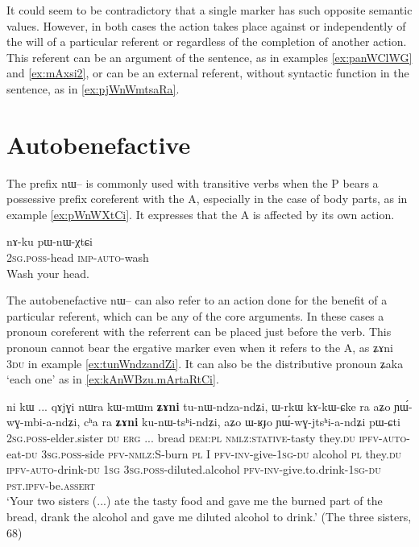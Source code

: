 \documentclass[oldfontcommands,oneside,a4paper,11pt]{article}
\newcommand{\ipa}[1]{{\phon \mbox{#1}}} %
\begin{document}
It could seem to be contradictory that a single marker has such opposite semantic values. However, in both cases the action takes place against or independently of the will of a particular referent or regardless of the completion of another action. This referent can be an argument of the sentence, as in examples \ref{ex:panWClWG} and \ref{ex:mAxsi2}, or can be an external referent, without syntactic function in the sentence, as in \ref{ex:pjWnWmtsaRa}. 


 
\section{Autobenefactive}

The prefix \ipa{nɯ--}  is commonly used with transitive verbs when the P bears a possessive prefix coreferent with the A, especially in the case of body parts, as in example \ref{ex:pWnWXtCi}. It expresses that the A is affected by its own action.

\begin{exe}
\ex \label{ex:pWnWXtCi}
\gll 
\ipa{nɤ-ku} 	\ipa{pɯ-nɯ-χtɕi} \\
\textsc{2sg.poss}-head \textsc{imp-auto}-wash \\
\glt Wash your head.
\end{exe}

The autobenefactive \ipa{nɯ--} can also refer to an action done for the benefit of a particular referent, which can be any of the core arguments. In these cases a pronoun coreferent with the referrent can be placed just before the verb. This pronoun cannot bear the ergative marker even when it refers to the A, as \ipa{ʑɤni} \textsc{3du} in example \ref{ex:tunWndzandZi}. It can also be the distributive pronoun \ipa{ʑaka} `each one' as in \ref{ex:kAnWBzu.mArtaRtCi}.

   \begin{exe}
\ex \label{ex:tunWndzandZi}
\gll  \ipa{nɤ-pi}   	\ipa{ni}   	\ipa{kɯ}   	...   	\ipa{qɤjɣi}   	\ipa{nɯra}   	\ipa{kɯ-mɯm}   	\textbf{\ipa{ʑɤni}}   	\ipa{tu-nɯ-ndza-ndʑi,}   	\ipa{ɯ-rkɯ}   	\ipa{kɤ-kɯ-ɕke}   	\ipa{ra}   	\ipa{aʑo}   	\ipa{ɲɯ́-wɣ-mbi-a-ndʑi,}   	\ipa{cʰa}   	\ipa{ra}   	\textbf{\ipa{ʑɤni}}   	\ipa{ku-nɯ-tsʰi-ndʑi,}   	\ipa{aʑo}   	\ipa{ɯ-ʁɟo}   	\ipa{ɲɯ́-wɣ-jtsʰi-a-ndʑi}   	\ipa{pɯ-ɕti}        \\
\textsc{2sg.poss}-elder.sister \textsc{du} \textsc{erg} ... bread \textsc{dem:pl} \textsc{nmlz:stative}-tasty they.\textsc{du} \textsc{ipfv}-\textsc{auto}-eat-\textsc{du} \textsc{3sg.poss}-side \textsc{pfv}-\textsc{nmlz:S}-burn \textsc{pl}  I \textsc{pfv}-\textsc{inv}-give-\textsc{1sg}-\textsc{du} alcohol \textsc{pl} they.\textsc{du} \textsc{ipfv}-\textsc{auto}-drink-\textsc{du} \textsc{1sg} \textsc{3sg.poss}-diluted.alcohol \textsc{pfv}-\textsc{inv}-give.to.drink-\textsc{1sg}-\textsc{du} \textsc{pst.ipfv}-be.\textsc{assert}  \\
 \glt    `Your two sisters (...) ate the tasty food and gave me the burned part of the bread, drank the alcohol and gave me diluted alcohol to drink.'  (The three sisters, 68)
\end{exe} 
\end{document}
